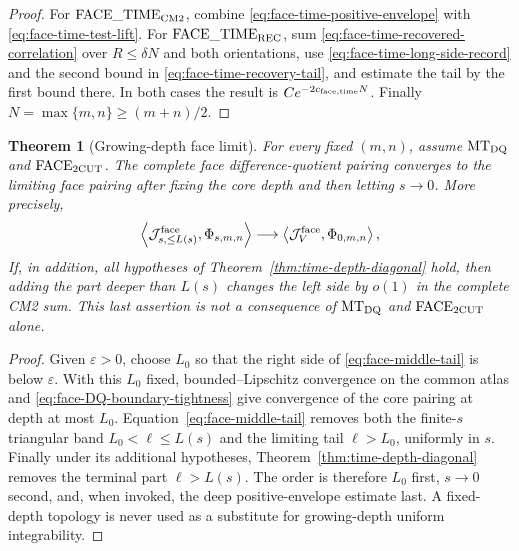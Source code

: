 \documentclass[11pt]{article}
\newtheorem{theorem}{Theorem}[section]
\begin{document}
\begin{proof}
For $\mathrm{FACE\_TIME}_{\rm CM2}$, combine
\eqref{eq:face-time-positive-envelope} with
\eqref{eq:face-time-test-lift}.  For
$\mathrm{FACE\_TIME}_{\rm REC}$, sum
\eqref{eq:face-time-recovered-correlation} over $R\le\delta N$ and both
orientations, use \eqref{eq:face-time-long-side-record} and the second bound
in \eqref{eq:face-time-recovery-tail}, and estimate the tail by the first
bound there.  In both cases the result is $Ce^{-2c_{\rm face,time}N}$.
Finally $N=\max\{m,n\}\ge(m+n)/2$.
\end{proof}

\begin{theorem}[Growing-depth face limit]
\label{thm:face-two-cutoff}
For every fixed $(m,n)$, assume $\mathrm{MT}_{\rm DQ}$ and
$\mathrm{FACE}_{\rm 2CUT}$.  The complete face difference-quotient pairing
converges to the limiting face pairing after fixing the core depth and then
letting $s\to0$.  More precisely,
\begin{equation}
\label{eq:face-growing-depth-convergence}
 \left\langle\mathcal J_{s,\le L(s)}^{\rm face},
       \Phi_{s,m,n}\right\rangle
 \longrightarrow
\left\langle\mathcal J_{V}^{\rm face},
       \Phi_{0,m,n}\right\rangle,
\end{equation}
If, in addition, all hypotheses of
Theorem~\ref{thm:time-depth-diagonal} hold, then adding the part deeper than
$L(s)$ changes the left side by $o(1)$ in the complete CM2 sum.  This last
assertion is not a consequence of $\mathrm{MT}_{\rm DQ}$ and
$\mathrm{FACE}_{\rm 2CUT}$ alone.
\end{theorem}

\begin{proof}
Given $\varepsilon>0$, choose $L_0$ so that the right side of
\eqref{eq:face-middle-tail} is below $\varepsilon$.  With this $L_0$ fixed,
bounded--Lipschitz convergence on the common atlas and
\eqref{eq:face-DQ-boundary-tightness} give convergence of the core pairing
at depth at most $L_0$.  Equation~\eqref{eq:face-middle-tail} removes both
the finite-$s$ triangular band $L_0<\ell\le L(s)$ and the limiting tail
$\ell>L_0$, uniformly in $s$.  Finally
under its additional hypotheses,
Theorem~\ref{thm:time-depth-diagonal} removes the terminal part
$\ell>L(s)$.  The order is therefore $L_0$ first, $s\to0$ second, and,
when invoked, the deep positive-envelope estimate last.  A fixed-depth topology is never used
as a substitute for growing-depth uniform integrability.
\end{proof}
\end{document}
